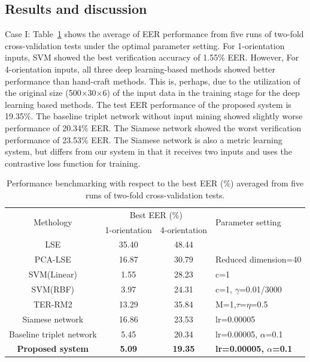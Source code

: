 \documentclass[sigconf]{acmart}
\begin{document}
\subsection{Results and discussion}

Case I: Table~\ref{tab3} shows the average of EER performance from five runs of two-fold cross-validation tests under the optimal parameter setting. For 1-orientation inputs, SVM showed the best verification accuracy of 1.55\% EER. However, For 4-orientation inputs, all three deep learning-based methods showed better performance than hand-craft methods. This is, perhaps, due to the utilization of the original size (500$\times$30$\times$6) of the input data in the training stage for the deep learning based methods. The test EER performance of the proposed system is 19.35\%. The baseline triplet network without input mining showed slightly worse performance of 20.34\% EER. The Siamese network showed the worst verification performance of 23.53\% EER. The Siamese network is also a metric learning system, but differs from our system in that it receives two inputs and uses the contrastive loss function for training. 
\begin{table}
    \caption{Performance benchmarking with respect to the best EER (\%) averaged from five runs of two-fold cross-validation tests.}
    \label{tab3}
    \begin{tabular}{cccl}
    \toprule
    \multirow{2}{*}{Methology} & \multicolumn{2}{c}{Best EER (\%)} & \multirow{2}{*}{Parameter setting} \\ \cline{2-3}           & 1-orientation & 4-orientation     &    \\
    \midrule
    LSE                                    & 35.40 & 48.44           &                           \\ 
    PCA-LSE                                & 16.87 & 30.79           & Reduced dimension=40        \\ 
    SVM(Linear)                            & 1.55 & 28.23            & c=1                        \\ 
    SVM(RBF)                               & 3.97 & 24.31            & c=1, $\gamma$=0.01/3000    \\ 
    TER-RM2                                & 13.29 & 35.84          & M=1,$\tau$=$\eta$=0.5      \\
    \midrule
    Siamese network                        & 16.86 & 23.53           & lr=0.00005                 \\ 
    Baseline triplet network               & 5.45 & 20.34           & lr=0.00005, $\alpha$=0.1   \\ 
    \textbf{Proposed system}               & \textbf{5.09} & \textbf{19.35}           & \textbf{lr=0.00005, $\alpha$=0.1}   \\
    \bottomrule
    \end{tabular}
\end{table}
\end{document}
